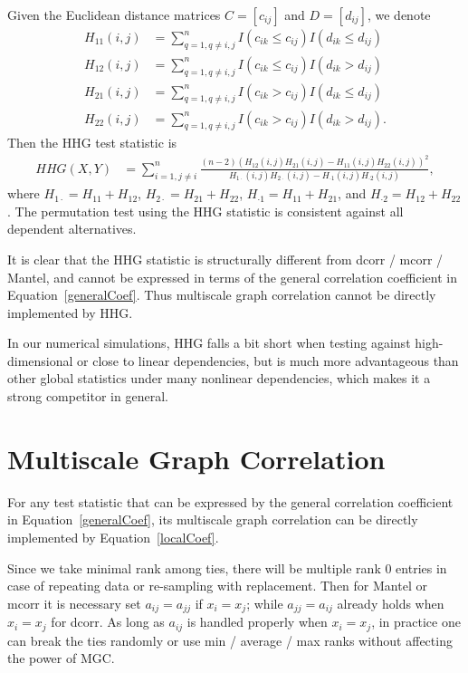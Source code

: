 \documentclass[11pt]{article}
\begin{document}
Given the Euclidean distance matrices $C=[c_{ij}]$ and $D=[d_{ij}]$, we denote
\begin{align*}
H_{11}(i,j) &= \sum_{q=1,q\neq i,j}^{n}I(c_{ik} \leq c_{ij})I(d_{ik} \leq d_{ij}) \\
H_{12}(i,j) &= \sum_{q=1,q\neq i,j}^{n}I(c_{ik} \leq c_{ij})I(d_{ik} > d_{ij}) \\
H_{21}(i,j) &= \sum_{q=1,q\neq i,j}^{n}I(c_{ik} > c_{ij})I(d_{ik} \leq d_{ij}) \\
H_{22}(i,j) &= \sum_{q=1,q\neq i,j}^{n}I(c_{ik} > c_{ij})I(d_{ik} > d_{ij}).
\end{align*}
Then the HHG test statistic is
\begin{align*}
HHG(X,Y) &= \sum_{i=1,j\neq i}^{n} \frac{(n-2)(H_{12}(i,j)H_{21}(i,j)-H_{11}(i,j)H_{22}(i,j))^2}{H_{1 \cdot}(i,j)H_{2 \cdot}(i,j)-H_{\cdot 1}(i,j)H_{\cdot 2}(i,j)},
\end{align*}
where $H_{1 \cdot}=H_{11}+H_{12}$, $H_{2 \cdot}=H_{21}+H_{22}$, $H_{\cdot 1}=H_{11}+H_{21}$, and $H_{\cdot 2}=H_{12}+H_{22}$. The permutation test using the HHG statistic is consistent against all dependent alternatives.

It is clear that the HHG statistic is structurally different from dcorr / mcorr / Mantel, and cannot be expressed in terms of the general correlation coefficient in Equation~\ref{generalCoef}. Thus multiscale graph correlation cannot be directly implemented by HHG.

In our numerical simulations, HHG falls a bit short when testing against high-dimensional or close to linear dependencies, but is much more advantageous than other global statistics under many nonlinear dependencies, which makes it a strong competitor in general. 

\section{Multiscale Graph Correlation}
\label{appen:MGC}

For any test statistic that can be expressed by the general correlation coefficient in Equation~\ref{generalCoef}, its multiscale graph correlation can be directly implemented by Equation~\ref{localCoef}. 

Since we take minimal rank among ties, there will be multiple rank $0$ entries in case of repeating data or re-sampling with replacement. Then for Mantel or mcorr it is necessary set $a_{ij}=a_{jj}$ if $x_{i}=x_{j}$; while $a_{jj}=a_{ij}$ already holds when $x_{i}=x_{j}$ for dcorr. As long as $a_{ij}$ is handled properly when $x_{i}=x_{j}$, in practice one can break the ties randomly or use min / average / max ranks without affecting the power of MGC.
\end{document}
